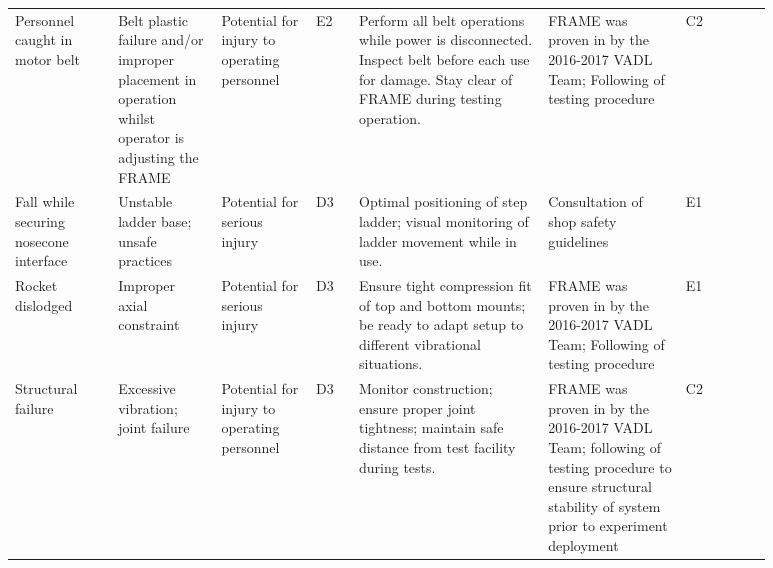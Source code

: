 \begin{footnotesize}
\begin{longtable}{|L{0.12\linewidth}|L{0.12\linewidth}|L{0.11\linewidth}|C{0.05\linewidth} |L{0.22\linewidth}|L{0.16\linewidth}|C{0.10\linewidth}|}
			\pagebreak
			  \\
			\hline
			Personnel caught in motor belt & Belt plastic failure and/or improper placement in operation whilst operator is adjusting the FRAME & Potential for injury to operating personnel &  E2 & Perform all belt operations while power is disconnected. Inspect belt before each use for damage. Stay clear of FRAME during testing operation. & FRAME was proven in by the 2016-2017 VADL Team; Following of testing procedure &  C2 \\
			\hline
			Fall while securing nosecone interface & Unstable ladder base; unsafe practices & Potential for serious injury &  D3 & Optimal positioning of step ladder; visual monitoring of ladder movement while in use. & Consultation of shop safety guidelines &  E1 \\
			\hline
			Rocket dislodged & Improper axial constraint & Potential for serious injury &  D3 & Ensure tight compression fit of top and bottom mounts; be ready to adapt setup to different vibrational situations. & FRAME was proven in by the 2016-2017 VADL Team; Following of testing procedure &  E1 \\
			\hline
			Structural failure & Excessive vibration; joint failure & Potential for injury to operating personnel &  D3 & Monitor construction; ensure proper joint tightness; maintain safe distance from test facility during tests. & FRAME was proven in by the 2016-2017 VADL Team; following of testing procedure to ensure structural stability of system prior to experiment deployment &  C2 \\
			\hline
			

\end{longtable}
\end{footnotesize}

